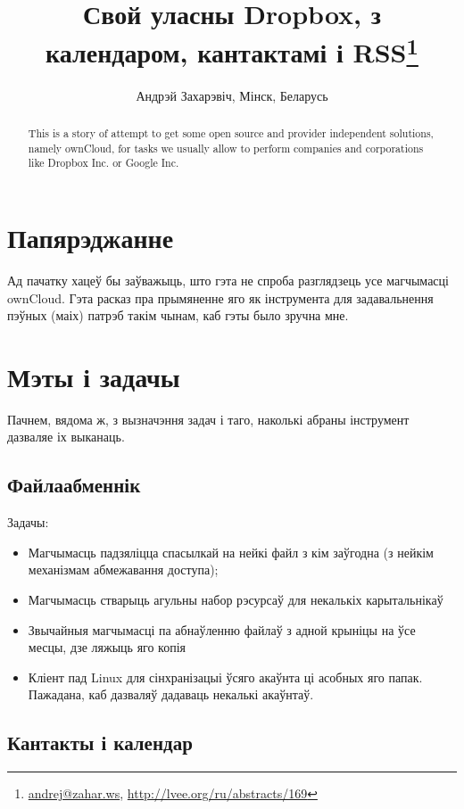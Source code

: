 \documentclass[10pt, a5paper]{article}
\begin{document}
\title{Свой уласны Dropbox, з календаром, кантактамі і RSS\footnote{\url{andrej@zahar.ws}, \url{http://lvee.org/ru/abstracts/169}}}
\author{Андрэй Захарэвіч, Мінск, Беларусь}
\maketitle
\begin{abstract}
This is a story of attempt to get some open source and provider independent solutions, namely ownCloud, for tasks we usually allow to perform companies and corporations like Dropbox Inc. or Google Inc. 
\end{abstract}
\section*{Папярэджанне}

Ад пачатку хацеў бы заўважыць, што гэта не спроба разглядзець усе магчымасці ownCloud. Гэта расказ пра прымяненне яго як інструмента для задавальнення пэўных (маіх) патрэб такім чынам, каб гэты было зручна мне.

\section*{Мэты і задачы}

Пачнем, вядома ж, з вызначэння задач і таго, наколькі абраны інструмент дазваляе іх выканаць.

\subsection*{Файлаабменнік}

Задачы:

\begin{itemize}
  \item Магчымасць падзяліцца спасылкай на нейкі файл з кім заўгодна (з нейкім механізмам абмежавання доступа);
  \item Магчымасць стварыць агульны набор рэсурсаў для некалькіх карытальнікаў
  \item Звычайныя магчымасці па абнаўленню файлаў з адной крыніцы на ўсе месцы, дзе ляжыць яго копія
  \item Кліент пад Linux для сінхранізацыі ўсяго акаўнта ці асобных яго папак. Пажадана, каб дазваляў дадаваць некалькі акаўнтаў.
\end{itemize}

\subsection*{Кантакты і календар}
\end{document}
